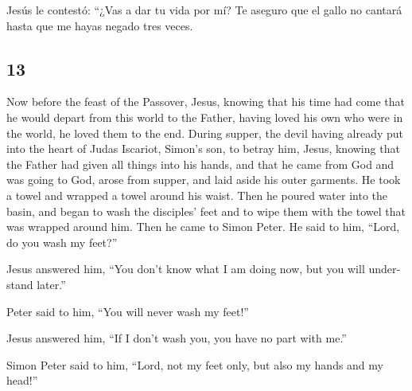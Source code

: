 \begin{paracol}{2}
 Jesús le contestó: ``¿Vas a dar tu vida por mí? Te
aseguro que el gallo no cantará hasta que me hayas negado tres veces.

\switchcolumn
\begin{otherlanguage}{english}

\hypertarget{section-25}{%
\section{13}\label{section-25}}

 Now before the feast of the Passover, Jesus, knowing that
his time had come that he would depart from this world to the Father,
having loved his own who were in the world, he loved them to the end.
 During supper, the devil having already put into the
heart of Judas Iscariot, Simon's son, to betray him, 
Jesus, knowing that the Father had given all things into his hands, and
that he came from God and was going to God,  arose from
supper, and laid aside his outer garments. He took a towel and wrapped a
towel around his waist.  Then he poured water into the
basin, and began to wash the disciples' feet and to wipe them with the
towel that was wrapped around him.  Then he came to Simon
Peter. He said to him, ``Lord, do you wash my feet?''

 Jesus answered him, ``You don't know what I am doing now,
but you will understand later.''

 Peter said to him, ``You will never wash my feet!''

Jesus answered him, ``If I don't wash you, you have no part with me.''

 Simon Peter said to him, ``Lord, not my feet only, but
also my hands and my head!''


\end{otherlanguage}
\end{paracol}
